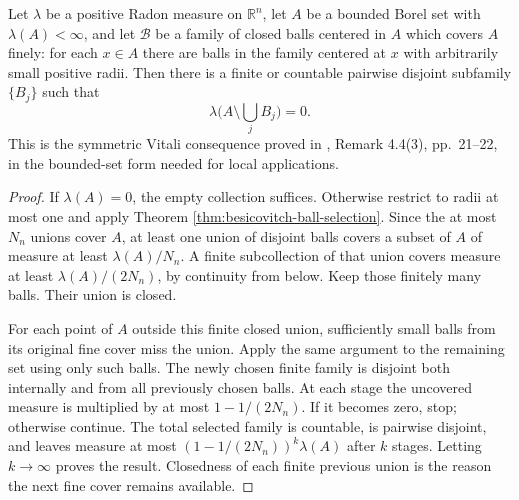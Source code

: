 \begin{proposition}\label{prop:radon-symmetric-vitali}
Let $\lambda$ be a positive Radon measure on $\mathbb R^n$, let $A$ be a bounded Borel set with $\lambda(A)<\infty$, and let $\mathcal B$ be a family of closed balls centered in $A$ which covers $A$ finely: for each $x\in A$ there are balls in the family centered at $x$ with arbitrarily small positive radii. Then there is a finite or countable pairwise disjoint subfamily $\{B_j\}$ such that
\[
 \lambda\bigl(A\setminus\bigcup_jB_j\bigr)=0.
\]
This is the symmetric Vitali consequence proved in \cite{Sim18}, Remark 4.4(3), pp.~21--22, in the bounded-set form needed for local applications.
\end{proposition}
\begin{proof}
If $\lambda(A)=0$, the empty collection suffices. Otherwise restrict to radii at most one and apply Theorem \ref{thm:besicovitch-ball-selection}. Since the at most $N_n$ unions cover $A$, at least one union of disjoint balls covers a subset of $A$ of measure at least $\lambda(A)/N_n$. A finite subcollection of that union covers measure at least $\lambda(A)/(2N_n)$, by continuity from below. Keep those finitely many balls. Their union is closed.

For each point of $A$ outside this finite closed union, sufficiently small balls from its original fine cover miss the union. Apply the same argument to the remaining set using only such balls. The newly chosen finite family is disjoint both internally and from all previously chosen balls. At each stage the uncovered measure is multiplied by at most $1-1/(2N_n)$. If it becomes zero, stop; otherwise continue. The total selected family is countable, is pairwise disjoint, and leaves measure at most $(1-1/(2N_n))^k\lambda(A)$ after $k$ stages. Letting $k\to\infty$ proves the result. Closedness of each finite previous union is the reason the next fine cover remains available.
\end{proof}

